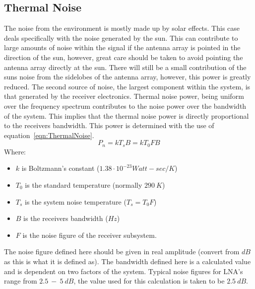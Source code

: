 \documentclass[11pt]{witseiepaper}
\begin{document}
\begin{bibunit}[witseie]
\subsection{Thermal Noise} \label{sec:ThermalNoise}
The noise from the environment is mostly made up by solar effects. This case deals specifically with the noise generated by the sun. This can contribute to large amounts of noise within the signal if the antenna array is pointed in the direction of the sun, however, great care should be taken to avoid pointing the antenna array directly at the sun. There will still be a small contribution of the suns noise from the sidelobes of the antenna array, however, this power is greatly reduced.
The second source of noise, the largest component within the system, is that generated by the receiver electronics.
Thermal noise power, being uniform over the frequency spectrum contributes to the noise power over the bandwidth of the system. This implies that the thermal noise power is directly proportional to the receivers bandwidth. This power is determined with the use of equation~\ref{eqn:ThermalNoise}.
\begin{equation} \label{eqn:ThermalNoise}
P_{n} = k T_{s} B = k T_{0} F B
\end{equation}
Where:
\begin{itemize}
    \item $k$ is Boltzmann's constant ($1.38 \cdot 10^{-23} Watt-sec/K$)
    \item $T_{0}$ is the standard temperature (normally $290~K$)
    \item $T_{s}$ is the system noise temperature ($T_{s} = T_{0} F$)
    \item $B$ is the receivers bandwidth ($Hz$)
    \item $F$ is the noise figure of the receiver subsystem.
\end{itemize}
The noise figure defined here should be given in real amplitude (convert from $dB$ as this is what it is defined as). The bandwidth defined here is a calculated value and is dependent on two factors of the system. Typical noise figures for LNA's range from $2.5~-~5~dB$, the value used for this calculation is taken to be $2.5~dB$.


\end{bibunit}
\end{document}
